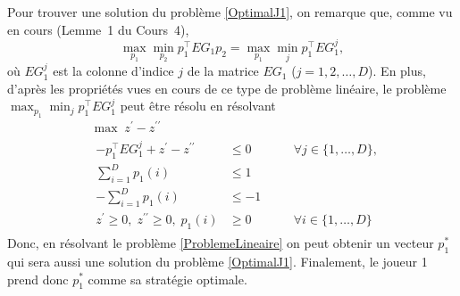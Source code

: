 \documentclass[a4paper,11pt]{amsart}
\theoremstyle{plain}
\begin{document}
Pour trouver une solution du problème \eqref{OptimalJ1}, on remarque que, comme vu en cours (Lemme~1 du Cours~4),
\[
\max_{p_1} \min_{p_2} p_1^\top EG_1 p_2 = \max_{p_1} \min_{j} p_1^\top EG_1^j,
\]
où $EG_1^j$ est la colonne d'indice $j$ de la matrice $EG_1$ ($j = 1, 2, \dotsc, D$). En plus, d'après les propriétés vues en cours de ce type de problème linéaire, le problème $\max_{p_1} \min_{j} p_1^\top EG_1^j$ peut être résolu en résolvant
\begin{equation}
\label{ProblemeLineaire}
\begin{aligned}
& \max\; z^\prime - z^{\prime\prime} \\
& \begin{aligned}
- p_1^\top EG_1^j + z^\prime - z^{\prime\prime} & \leq 0 & \quad & \forall j \in \{1, \dotsc, D\}, \\
\textstyle\sum_{i=1}^D p_1(i) & \leq 1 \\
\textstyle-\sum_{i=1}^D p_1(i) & \leq -1 \\
z^\prime \geq 0,\; z^{\prime\prime}\geq 0,\; p_1(i) & \geq 0 & & \forall i \in \{1, \dotsc, D\}
\end{aligned}
\end{aligned}
\end{equation}
Donc, en résolvant le problème \eqref{ProblemeLineaire} on peut obtenir un vecteur $p_1^\ast$ qui sera aussi une solution du problème \eqref{OptimalJ1}. Finalement, le joueur 1 prend donc $p_1^\ast$ comme sa stratégie optimale.
\end{document}
